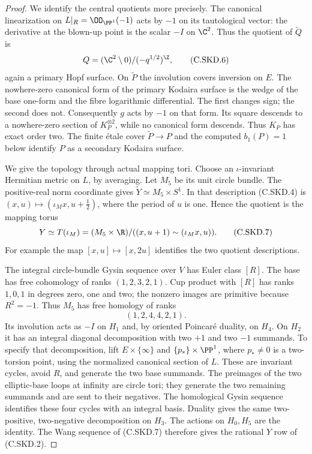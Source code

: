 \begin{proof}
We identify the central quotients more precisely.
The canonical linearization on
$L|_R=\OO_{\PP^1}(-1)$ acts by $-1$ on its
tautological vector: the derivative at the
blown-up point is the scalar $-I$ on $\C^2$.
Thus the quotient of $\widetilde Q$ is
\[
                 Q=(\C^2\setminus0)/
                         (-q^{1/2})^{\Z},              \tag{C.SKD.6}
\]
again a primary Hopf surface. On $\widetilde P$
the involution covers inversion on $E$.
The nowhere-zero canonical form of the primary
Kodaira surface is the wedge of the base
one-form and the fibre logarithmic differential.
The first changes sign; the second does not.
Consequently $g$ acts by $-1$ on that form.
Its square descends to a nowhere-zero section
of $K_P^{\otimes2}$, while no canonical form
descends. Thus $K_P$ has exact order two.
The finite \'etale cover $\widetilde P\to P$
and the computed $b_1(P)=1$ below identify $P$
as a secondary Kodaira surface.

We give the topology through actual mapping
tori. Choose an $\iota$-invariant Hermitian
metric on $L$, by averaging. Let $M_5$ be its
unit circle bundle. The positive-real norm
coordinate gives
$\widetilde Y\simeq M_5\times S^1$. In that
description (C.SKD.4) is
$(x,u)\mapsto(\iota_Mx,u+\tfrac12)$, where
the period of $u$ is one. Hence the quotient
is the mapping torus
\[
          Y\simeq T(\iota_M)
            =(M_5\times\R)/
               ((x,u+1)\sim(\iota_Mx,u)).               \tag{C.SKD.7}
\]
For example the map $[x,u]\mapsto[x,2u]$
identifies the two quotient descriptions.

The integral circle-bundle Gysin sequence
over $V$ has Euler class $[R]$. The base has
free cohomology of ranks $(1,2,3,2,1)$.
Cup product with $[R]$ has ranks $1,0,1$
in degrees zero, one and two; the nonzero
images are primitive because $R^2=-1$.
Thus $M_5$ has free homology of ranks
\[
                         (1,2,4,4,2,1).                \tag{C.SKD.8}
\]
Its involution acts as $-I$ on $H_1$ and,
by oriented Poincar\'e duality, on $H_4$.
On $H_2$ it has an integral diagonal
decomposition with two $+1$ and two $-1$
summands. To specify that decomposition,
lift $E\times\{\infty\}$ and
$\{p_*\}\times\PP^1$, where $p_*\ne0$ is
a two-torsion point, using the normalized
canonical section of $L$. These are
invariant cycles, avoid $R$, and generate
the two base summands. The preimages of
the two elliptic-base loops at infinity
are circle tori; they generate the two
remaining summands and are sent to their
negatives. The homological Gysin sequence
identifies these four cycles with an
integral basis. Duality gives the same
two-positive, two-negative decomposition
on $H_3$. The actions on $H_0,H_5$ are
the identity. The Wang sequence of
(C.SKD.7) therefore gives the rational
$Y$ row of (C.SKD.2).


\end{proof}
